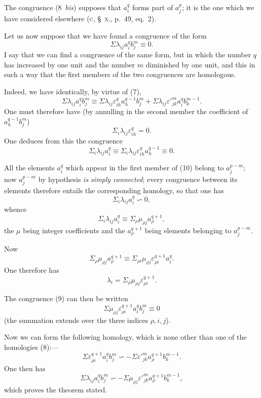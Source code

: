\documentclass{article}
\begin{document}
The congruence (8~\emph{bis}) supposes that $a^{q}_{i}$ forms part of $a^{p}_{j}$; it is the one which we have considered elsewhere (\textsc{c}, \S~\textsc{x}., p.\ 49, eq.~2).

Let us now suppose that we have found a congruence of the form
\[ \Sigma \lambda_{ij} a^{q}_{i} b^{m}_{j} \equiv 0. \tag{9} \]
I say that we can find a congruence of the same form, but in which the number $q$ has increased by one unit and the number $m$ diminished by one unit, and this in such a way that the first members of the two congruences are homologous.

Indeed, we have identically, by virtue of (7),
\[ \Sigma \lambda_{ij} a^{q}_{i} b^{m}_{j} \equiv \Sigma \lambda_{ij} \varepsilon^{q}_{ih} a^{q-1}_{h} b^{m}_{j} + \Sigma \lambda_{ij} \varepsilon'^{m}_{jk} a^{q}_{i} b^{m-1}_{k}. \]
One must therefore have (by annulling in the second member the coefficient of $a^{q-1}_{h} b^{m}_{j}$)
\[ \Sigma_{i} \lambda_{ij} \varepsilon^{q}_{ih} = 0. \]
One deduces from this the congruence
\[ \Sigma_{i} \lambda_{ij} a^{q}_{i} \equiv \Sigma_{i} \lambda_{ij} \varepsilon^{q}_{ih} a^{q-1}_{h} \equiv 0. \tag{10} \]

All the elements $a^{q}_{i}$ which appear in the first member of (10) belong to $a^{p-m}_{j}$; now $a^{p-m}_{j}$ by hypothesis \emph{is simply connected}; every congruence between its elements therefore entails the corresponding homology, so that one has
\[ \Sigma_{i} \lambda_{ij} a^{q}_{i} \backsim 0, \]
whence
\[ \Sigma_{i} \lambda_{ij} a^{q}_{i} \equiv \Sigma_{\rho} \mu_{\rho j} a^{q+1}_{\rho}, \]
the $\mu$ being integer coefficients and the $a^{q+1}_{\rho}$ being elements belonging to $a^{p-m}_{j}$.

Now
\[ \Sigma_{\rho} \mu_{\rho j} a^{q+1}_{\rho} \equiv \Sigma_{\rho i} \mu_{\rho j} \varepsilon^{q+1}_{\rho i} a^{q}_{i}. \]
One therefore has
\[ \lambda_{i} = \Sigma_{\rho} \mu_{\rho j} \varepsilon^{q+1}_{\rho i}. \]

The congruence (9) can then be written
\[ \Sigma \mu_{\rho j} \varepsilon^{q+1}_{\rho i} a^{q}_{i} b^{m}_{j} \equiv 0 \]
(the summation extends over the three indices $\rho, i, j$).

Now we can form the following homology, which is none other than one of the homologies (8):---
\[ \Sigma \varepsilon^{q+1}_{\rho i} a^{q}_{i} b^{m}_{j} \backsim -\Sigma \varepsilon'^{m}_{jk} a^{q+1}_{\rho} b^{m-1}_{k}. \tag{11} \]
One then has
\[ \Sigma \lambda_{ij} a^{q}_{i} b^{m}_{j} \backsim -\Sigma \mu_{\rho j} \varepsilon'^{m}_{jk} a^{q+1}_{\rho} b^{m-1}_{k}, \]
which proves the theorem stated.
\end{document}

